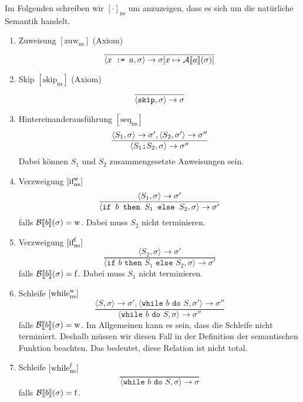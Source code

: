 Im Folgenden schreiben wir $[\cdot]_{\text{ns}}$ um anzuzeigen, dass es sich um die natürliche Semantik handelt.

\begin{enumerate}
    \item Zuweisung $[\text{zuw}_{\text{ns}}]$ (Axiom)
    \[
    \frac{}{\langle x \texttt{ := } a, \sigma \rangle \to \sigma[x \mapsto \mathcal{A}\mathrm{[}\kern-.14em\mathrm{[} a\mathrm{]}\kern-.14em\mathrm{]}(\sigma)]}
    \]

    \item Skip $[\text{skip}_{\text{ns}}]$ (Axiom)
    \[
    \frac{}{\langle \texttt{skip}, \sigma \rangle \to \sigma}
    \]

    \item Hintereinanderausführung $[\text{seq}_{\text{ns}}]$
    \[
    \frac{\langle S_1, \sigma \rangle \to \sigma', \langle S_2, \sigma' \rangle \to \sigma''}{\langle S_1 \texttt{;} S_2, \sigma \rangle \to \sigma''}
    \]
    Dabei können $S_1$ und $S_2$ zusammengesetzte Anweisungen sein.

    \item Verzweigung $[\text{if}_{\text{ns}}^{\operatorname{w}}]$
    \[
    \frac{\langle S_1, \sigma \rangle \to \sigma'}{\langle \texttt{if } b \texttt{ then } S_1 \texttt{ else } S_2, \sigma \rangle \to \sigma'}
    \]
    falls $\mathcal{B}\mathrm{[}\kern-.14em\mathrm{[} b\mathrm{]}\kern-.14em\mathrm{]}(\sigma) = \operatorname{w}$. Dabei muss $S_2$ nicht terminieren.

    \item Verzweigung $[\text{if}_{\text{ns}}^{\operatorname{f}}]$
    \[
    \frac{\langle S_2, \sigma \rangle \to \sigma'}{\langle \texttt{if } b \texttt{ then } S_1 \texttt{ else } S_2, \sigma \rangle \to \sigma'}
    \]
    falls $\mathcal{B}\mathrm{[}\kern-.14em\mathrm{[} b\mathrm{]}\kern-.14em\mathrm{]}(\sigma) = \operatorname{f}$. Dabei muss $S_1$ nicht terminieren.

    \item Schleife $[\text{while}_{\text{ns}}^{\operatorname{w}}]$
    \[
    \frac{\langle S, \sigma \rangle \to \sigma', \langle \texttt{while } b \texttt{ do } S, \sigma' \rangle \to \sigma''}{\langle \texttt{while } b \texttt{ do } S, \sigma \rangle \to \sigma''}
    \]
    falls $\mathcal{B}\mathrm{[}\kern-.14em\mathrm{[} b\mathrm{]}\kern-.14em\mathrm{]}(\sigma) = \operatorname{w}$. Im Allgemeinen kann es sein, dass die Schleife nicht terminiert. Deshalb müssen wir diesen Fall in der Definition der semantischen Funktion beachten. Das bedeutet, diese Relation ist nicht total.

    \item Schleife $[\text{while}_{\text{ns}}^{\operatorname{f}}]$
    \[
    \frac{\text{ }}{\langle \texttt{while } b \texttt{ do } S, \sigma \rangle \to \sigma}
    \]
    falls $\mathcal{B}\mathrm{[}\kern-.14em\mathrm{[} b\mathrm{]}\kern-.14em\mathrm{]}(\sigma) = \operatorname{f}$.
\end{enumerate}

